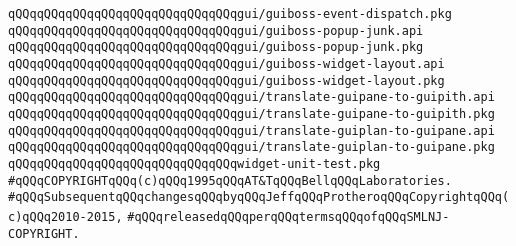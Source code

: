 \verb|qQQqqQQqqQQqqQQqqQQqqQQqqQQqqQQqgui/guiboss-event-dispatch.pkg|\newline
\newline
\verb|qQQqqQQqqQQqqQQqqQQqqQQqqQQqqQQqgui/guiboss-popup-junk.api|\newline
\verb|qQQqqQQqqQQqqQQqqQQqqQQqqQQqqQQqgui/guiboss-popup-junk.pkg|\newline
\newline
\verb|qQQqqQQqqQQqqQQqqQQqqQQqqQQqqQQqgui/guiboss-widget-layout.api|\newline
\verb|qQQqqQQqqQQqqQQqqQQqqQQqqQQqqQQqgui/guiboss-widget-layout.pkg|\newline
\newline
\verb|qQQqqQQqqQQqqQQqqQQqqQQqqQQqqQQqgui/translate-guipane-to-guipith.api|\newline
\verb|qQQqqQQqqQQqqQQqqQQqqQQqqQQqqQQqgui/translate-guipane-to-guipith.pkg|\newline
\newline
\verb|qQQqqQQqqQQqqQQqqQQqqQQqqQQqqQQqgui/translate-guiplan-to-guipane.api|\newline
\verb|qQQqqQQqqQQqqQQqqQQqqQQqqQQqqQQqgui/translate-guiplan-to-guipane.pkg|\newline
\newline
\verb|qQQqqQQqqQQqqQQqqQQqqQQqqQQqqQQqwidget-unit-test.pkg|\newline
\newline
\verb|#qQQqCOPYRIGHTqQQq(c)qQQq1995qQQqAT&TqQQqBellqQQqLaboratories.|\newline
\verb|#qQQqSubsequentqQQqchangesqQQqbyqQQqJeffqQQqProtheroqQQqCopyrightqQQq(c)qQQq2010-2015,|\newline
\verb|#qQQqreleasedqQQqperqQQqtermsqQQqofqQQqSMLNJ-COPYRIGHT.|\newline


